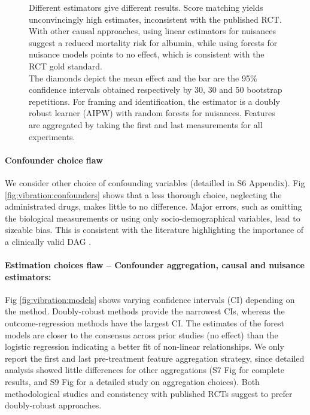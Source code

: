 \documentclass[10pt,letterpaper]{article}
\begin{document}
\begin{figure}[h!]
{    Different estimators give different results. Score matching yields
    unconvincingly high estimates, inconsistent with the published RCT. With
    other causal approaches, using linear estimators for nuisances suggest a
    reduced mortality risk for albumin, while using forests for nuisance models
    points to no effect, which is consistent with the RCT gold standard.
    \\The diamonds depict the mean effect and the bar are the 95\% confidence
    intervals obtained respectively by 30, 30 and 50 bootstrap repetitions. For
    framing and identification, the estimator is a doubly robust learner (AIPW)
    with random forests for nuisances. Features are aggregated by taking the
    first and last measurements for all experiments.}\label{fig:vibration_analysis}
\end{figure}


\paragraph{Confounder choice flaw} We consider other choice of confounding variables
(detailled in S6 Appendix). Fig
\ref{fig:vibration:confounders} shows that a less thorough choice, neglecting
the administrated drugs, makes little to no difference. Major errors, such as
omitting the biological measurements or using only socio-demographical
variables, lead to sizeable bias. This is consistent with the literature
highlighting the importance of a clinically valid DAG \cite{greenland1999causal}.

\paragraph{Estimation choices flaw -- Confounder aggregation, causal and nuisance estimators:}

Fig \ref{fig:vibration:models} shows varying confidence intervals (CI)
depending on the method. Doubly-robust methods provide the narrowest CIs,
whereas the outcome-regression methods have the largest CI. The estimates of the
forest models are closer to the consensus across prior studies (no effect) than
the logistic regression indicating a better fit of non-linear relationships. We
only report the first and last pre-treatment feature aggregation strategy, since
detailed analysis showed little differences for other aggregations (S7 Fig for complete results, and S9 Fig for a detailed study on aggregation choices). Both methodological studies \cite{naimi2023challenges} and
consistency with published RCTs suggest to prefer doubly-robust approaches.
\end{document}
